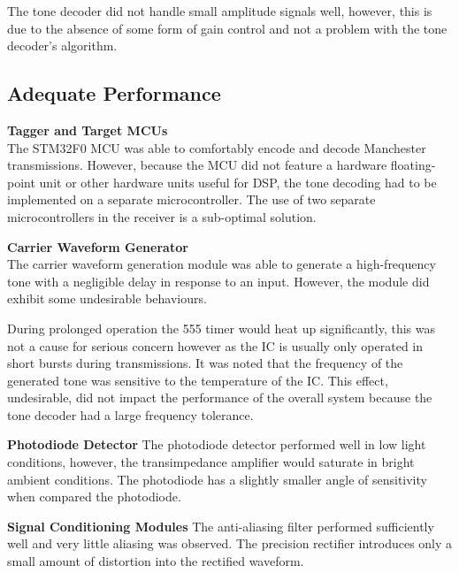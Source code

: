 The tone decoder did not handle small amplitude signals well, however, this is due to the absence of some form of gain control and not a problem with the tone decoder's algorithm.

\subsection{Adequate Performance}

\textbf{Tagger and Target MCUs}\\
The STM32F0 MCU was able to comfortably encode and decode Manchester transmissions. However, because the MCU did not feature a hardware floating-point unit or other hardware units useful for DSP, the tone decoding had to be implemented on a separate microcontroller. The use of two separate microcontrollers in the receiver is a sub-optimal solution.


\textbf{Carrier Waveform Generator}\\
The carrier waveform generation module was able to generate a high-frequency tone with a negligible delay in response to an input. However, the module did exhibit some undesirable behaviours.

During prolonged operation the 555 timer would heat up significantly, this was not a cause for serious concern however as the IC is usually only operated in short bursts during transmissions. It was noted that the frequency of the generated tone was sensitive to the temperature of the IC. This effect, undesirable, did not impact the performance of the overall system because the tone decoder had a large frequency tolerance. 

\textbf{Photodiode Detector}
The photodiode detector performed well in low light conditions, however, the transimpedance amplifier would saturate in bright ambient conditions. The photodiode has a slightly smaller angle of sensitivity when compared the photodiode.

\textbf{Signal Conditioning Modules}
The anti-aliasing filter performed sufficiently well and very little aliasing was observed. The precision rectifier introduces only a small amount of distortion into the rectified waveform.

















